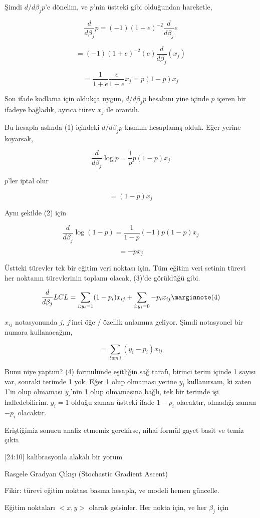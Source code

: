 \documentclass[12pt,fleqn]{article}\usepackage{../../common}
\begin{document}
Şimdi  $d/d\beta_j p$'e dönelim, ve $p$'nin üstteki gibi olduğundan
hareketle,

$$ \frac{ d}{d\beta_j}p = (-1)(1+e)^{-2} \frac{ d}{d\beta_j}e $$

$$ = (-1)(1+e)^{-2} (e) \frac{ d}{d\beta_j}(x_j) $$

$$ = \frac{ 1}{1+e} \frac{ e}{1+e}x_j = p(1-p)x_j$$

Son ifade kodlama için oldukça uygun, $d/d\beta_j p$ hesabını yine içinde
$p$ içeren bir ifadeye bağladık, ayrıca türev $x_j$ ile orantılı. 

Bu hesapla aslında (1) içindeki $d/d\beta_j p$ kısmını hesaplamış
olduk. Eğer yerine koyarsak, 

$$ 
\frac{d}{d\beta_j}\log p = \frac{1}{p}p(1-p)x_j 
$$

$p$'ler iptal olur

$$ 
= (1-p)x_j 
$$

Aynı şekilde (2) için 

$$ 
\frac{d}{d\beta_j}\log (1-p) = \frac{1}{1-p}(-1) p(1-p)x_j 
$$

$$ 
 =  -px_j 
$$

Üstteki türevler tek bir eğitim veri noktası için. Tüm eğitim veri setinin
türevi her noktanın türevlerinin toplamı olacak, (3)'de görüldüğü gibi.

$$ \frac{d}{d\beta_j} LCL = 
\sum_{i: y_i = 1} (1-p_i)x_{ij} + 
\sum_{i: y_i = 0} -p_i x_{ij}  
\mlabel{4}
$$

$x_{ij}$ notasyonunda $j$, $j$'inci öğe / özellik anlamına geliyor. Şimdi 
notasyonel bir numara kullanacağım, 

$$ = \sum_{tum \ i} (y_i - p_i)x_{ij} $$

Bunu niye yaptım? (4) formülünde eşitliğin sağ tarafı, birinci terim içinde
1 sayısı var, sonraki terimde 1 yok. Eğer 1 olup olmaması yerine $y_i$
kullanırsam, ki zaten 1'in olup olmaması $y_i$'nin 1 olup olmamasına bağlı,
tek bir terimde işi halledebilirim. $y_i=1$ olduğu zaman üstteki ifade
$1-p_i$ olacaktır, olmadığı zaman $-p_i$ olacaktır. 

Eriştiğimiz sonucu analiz etmemiz gerekirse, nihai formül gayet basit ve
temiz çıktı. 

[24:10] kalibrasyonla alakalı bir yorum

Rasgele Gradyan Çıkışı (Stochastic Gradient Ascent)

Fikir: türevi eğitim noktası basına hesapla, ve modeli hemen güncelle. 

Eğitim noktaları $< x,y >$ olarak gelsinler. Her nokta için, ve her $\beta_j$
için
\end{document}
